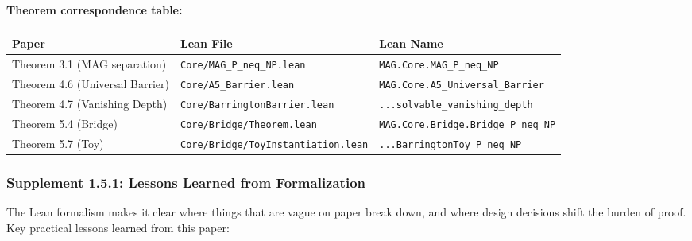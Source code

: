 \documentclass[11pt,a4paper]{article}
\theoremstyle{plain}
\theoremstyle{definition}
\newcommand{\lean}[1]{\texttt{#1}}
\begin{document}
\paragraph{Theorem correspondence table:}
\begin{center}
\small
\begin{tabular}{@{}p{}p{}p{}@{}}
\toprule
Paper & Lean File & Lean Name \\
\midrule
Theorem 3.1 (MAG separation) & \lean{Core/MAG\_P\_neq\_NP.lean} & \lean{MAG.Core.MAG\_P\_neq\_NP} \\
Theorem 4.6 (Universal Barrier) & \lean{Core/A5\_Barrier.lean} & \lean{MAG.Core.A5\_Universal\_Barrier} \\
Theorem 4.7 (Vanishing Depth) & \lean{Core/BarringtonBarrier.lean} & \lean{...solvable\_vanishing\_depth} \\
Theorem 5.4 (Bridge) & \lean{Core/Bridge/Theorem.lean} & \lean{MAG.Core.Bridge.Bridge\_P\_neq\_NP} \\
Theorem 5.7 (Toy) & \lean{Core/Bridge/ToyInstantiation.lean} & \lean{...BarringtonToy\_P\_neq\_NP} \\
\bottomrule
\end{tabular}
\end{center}

\subsubsection{Supplement 1.5.1: Lessons Learned from Formalization}

The Lean formalism makes it clear where things that are vague on paper break down, and where design decisions shift the burden of proof. Key practical lessons learned from this paper:
\end{document}
